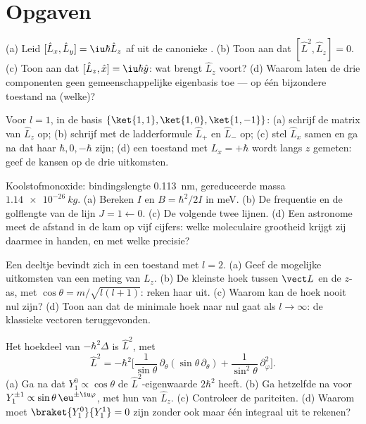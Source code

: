 \section{Opgaven}

\begin{exercise}[$\star$]\label{exo:b3:quantum-angular-momentum:1}
(a) Leid $[\hat L_x, \hat L_y] = \iu\hbar\hat L_z$ af uit de canonieke
. (b) Toon aan dat $[\hat L^2, \hat L_z] = 0$. (c) Toon aan
dat $[\hat L_z, \hat x] = \iu\hbar\hat y$: wat brengt $\hat L_z$ voort?
(d) Waarom laten de drie componenten geen gemeenschappelijke eigenbasis
toe --- op één bijzondere toestand na (welke)?
\end{exercise}

\begin{exercise}[$\star$]\label{exo:b3:quantum-angular-momentum:2}
Voor $l = 1$, in de basis $\{\ket{1,1}, \ket{1,0}, \ket{1,-1}\}$:
(a) schrijf de matrix van $\hat L_z$ op; (b) schrijf met de ladderformule
$\hat L_+$ en $\hat L_-$ op; (c) stel $\hat L_x$ samen en ga na dat haar
 $\hbar, 0, -\hbar$ zijn; (d) een toestand met $L_x =
+\hbar$
wordt langs $z$ gemeten: geef de kansen op de drie uitkomsten.
\end{exercise}

\begin{exercise}[$\star$]\label{exo:b3:quantum-angular-momentum:3}
Koolstofmonoxide: bindingslengte \qty{0.113}{nm}, gereduceerde massa
$\qty{1.14e-26}{kg}$. (a) Bereken $I$ en $B = \hbar^2/2I$ in meV.
(b) De frequentie en de golflengte van de lijn $J = 1 \leftarrow 0$.
(c) De volgende twee lijnen. (d) Een astronome meet de afstand in de kam
op vijf cijfers: welke moleculaire grootheid krijgt zij daarmee in
handen, en met welke precisie?
\end{exercise}

\begin{exercise}[$\star$]\label{exo:b3:quantum-angular-momentum:4}
Een deeltje bevindt zich in een toestand met $l = 2$. (a) Geef de mogelijke
uitkomsten van een meting van $L_z$. (b) De kleinste hoek tussen $\vect L$
en de $z$-as, met $\cos\theta = m/\sqrt{l(l+1)}$: reken haar uit. (c)
Waarom kan de hoek nooit nul zijn? (d) Toon aan dat de minimale hoek naar
nul gaat als $l \to \infty$: de klassieke vectoren teruggevonden.
\end{exercise}

\begin{exercise}[$\star\star$]\label{exo:b3:quantum-angular-momentum:5}
Het hoekdeel van $-\hbar^2\Delta$ is $\hat L^2$, met
\[
\hat L^2 = -\hbar^2\Big[\frac{1}{\sin\theta}\,\partial_\theta
(\sin\theta\,\partial_\theta) +
\frac{1}{\sin^2\theta}\,\partial_\varphi^2\Big] .
\]
(a) Ga na dat $Y_1^0 \propto \cos\theta$ de $\hat L^2$-eigenwaarde
$2\hbar^2$ heeft. (b) Ga hetzelfde na voor $Y_1^{\pm1} \propto \sin\theta\,
\eu^{\pm\iu\varphi}$, met hun  van $\hat L_z$. (c)
Controleer de pariteiten. (d) Waarom moet $\braket{Y_1^0}{Y_1^1} = 0$ zijn
zonder ook maar één integraal uit te rekenen?
\end{exercise}

